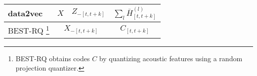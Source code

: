 \begin{table*}[!htb]
{\begin{tabular}{l|c|c|c}
    \midrule
    data2vec \cite{data2vec}    & $X$             & $Z_{-[t,t+k]}$          & $\sum_{l}\bar{H}^{(l)}_{[t,t+k]}$  \\ 
    \midrule 
    BEST-RQ \cite{BEST-RQ}\footnote{BEST-RQ obtains codes $C$ by quantizing acoustic features using a random projection quantizer.}     &  \multicolumn{2}{c|}{$X_{-[t,t+k]}$}      &  $C_{[t,t+k]}$   \\ 
    \midrule 
    \bottomrule
\end{tabular}
}
    
\label{table:pretext}
\end{table*}


\begin{comment}
\begin{table*}[ht!]
    \centering
    \caption{
    This table summarizes the approaches of the three categories of self-supervised learning. 
    Column (a) lists the names of the models and related references. 
    Column (b) defines the input to the models. 
    Column (c) defines any corruption of the input or some hidden representation. 
    Column (d) defines the target of the pretext task; the pretext task itself is described by the overall model category and the main text.
    $X=\{x_1,x_2,...,x_T\}$ is the input sequence in which $x_t$ can be an acoustic feature vector (e.g., MFCC, filterbank, or spectrogram features) or a waveform sample. 
    $X_{[t_1:t_2]}$ represents $\{x_{t_1},x_{t_1+1},...,x_{t_2}\}$.
    $X_{-[t_1:t_2]}$ represents $X$ with the segment $X_{[t_1:t_2]}=\{x_{t_1},x_{t_1+1},...,x_{t_2}\}$ masked.
    $x_{t}^{i}$ represents the $i$-th dimension of $x_t$.
    If $x_t$ is a frame in a spectrogram, then the $i$-th dimension corresponds to a specific frequency bin.
    $X^{-[f,f+j]}$ refers to a spectrogram $X$ but masked along the frequency axis from the $f$-th to $f+j$-th bin. 
    We indicate random temporal permutation of a sequence by indexing it with the set $\mathcal{P}_t\triangleq\textsc{permute}([0,t])$ where $\textsc{permute}(\cdot)$ returns a permutation of the given list. 
    We indicate data augmentation (e.g. reverberation) by the function $\textsc{augment}(\cdot)$. Subscripts indicate different augmentations. 

\end{comment}
